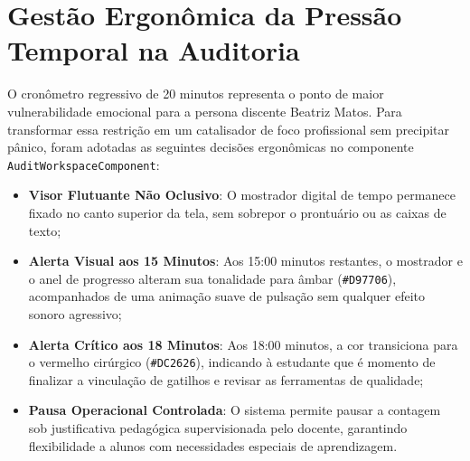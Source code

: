 \section{Gestão Ergonômica da Pressão Temporal na Auditoria}
\label{sec_ergonomia_tempo}

O cronômetro regressivo de 20 minutos representa o ponto de maior vulnerabilidade emocional para a persona discente Beatriz Matos. Para transformar essa restrição em um catalisador de foco profissional sem precipitar pânico, foram adotadas as seguintes decisões ergonômicas no componente \texttt{AuditWorkspaceComponent}:
\begin{itemize}
    \item \textbf{Visor Flutuante Não Oclusivo}: O mostrador digital de tempo permanece fixado no canto superior da tela, sem sobrepor o prontuário ou as caixas de texto;
    \item \textbf{Alerta Visual aos 15 Minutos}: Aos 15:00 minutos restantes, o mostrador e o anel de progresso alteram sua tonalidade para âmbar (\texttt{\#D97706}), acompanhados de uma animação suave de pulsação sem qualquer efeito sonoro agressivo;
    \item \textbf{Alerta Crítico aos 18 Minutos}: Aos 18:00 minutos, a cor transiciona para o vermelho cirúrgico (\texttt{\#DC2626}), indicando à estudante que é momento de finalizar a vinculação de gatilhos e revisar as ferramentas de qualidade;
    \item \textbf{Pausa Operacional Controlada}: O sistema permite pausar a contagem sob justificativa pedagógica supervisionada pelo docente, garantindo flexibilidade a alunos com necessidades especiais de aprendizagem.
\end{itemize}
